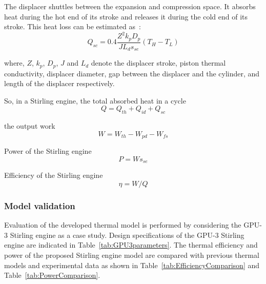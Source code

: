 \begin{enumerate}[label=(\arabic*)]
The displacer shuttles between the expansion and compression space. It absorbs heat during the hot end of its stroke and releases it during the cold end of its stroke. This heat loss can be estimated as~\cite{Timoumi2008}:
\begin{equation}
	Q_{sc} = 0.4\frac{Z^2k_pD_p}{JL_ds_{se}}(T_{H} - T_{L})
\end{equation}

where, $Z$, $k_p$, $D_p$, $J$ and $L_d$ denote the displacer stroke, piston thermal conductivity, displacer diameter, gap between the displacer and the cylinder, and length of the displacer respectively.

\end{enumerate}

So, in a Stirling engine, the total absorbed heat in a cycle
\begin{equation}
	Q = Q_{th} + Q_{id} + Q_{sc}
\end{equation}

the output work
\begin{equation}
	W = W_{th} - W_{pd} - W_{fs}
\end{equation}

Power of the Stirling engine
\begin{equation}
	P = Ws_{se}
	\label{Eq:P}
\end{equation}

Efficiency of the Stirling engine
\begin{equation}
	\eta = W/Q
	\label{Eq:eta}
\end{equation}


\subsubsection{Model validation}\label{sec:modelValidation}

Evaluation of the developed thermal model is performed by considering the GPU-3 Stirling engine as a case study. Design specifications of the GPU-3 Stirling engine are indicated in Table~\ref{tab:GPU3parameters}. The thermal efficiency and power of the proposed Stirling engine model are compared with previous thermal models and experimental data as shown in Table~\ref{tab:EfficiencyComparison} and Table~\ref{tab:PowerComparison}.

